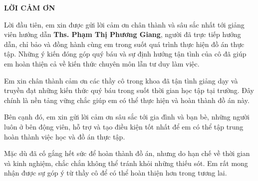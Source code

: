 \documentclass[../DoAn.tex]{subfiles}
\begin{document}
\begin{center}
    \Large{\textbf{LỜI CẢM ƠN}}\\
\end{center}

Lời đầu tiên, em xin được gửi lời cảm ơn chân thành và sâu sắc nhất tới giảng viên hướng dẫn \textbf{Ths. Phạm Thị Phương Giang}, người đã trực tiếp hướng dẫn, chỉ bảo và đồng hành cùng em trong suốt quá trình thực hiện đồ án thực tập. Những ý kiến đóng góp quý báu và sự định hướng tận tình của cô đã giúp em hoàn thiện cả về kiến thức chuyên môn lẫn tư duy làm việc.

Em xin chân thành cảm ơn các thầy cô trong khoa đã tận tình giảng dạy và truyền đạt những kiến thức quý báu trong suốt thời gian học tập tại trường. Đây chính là nền tảng vững chắc giúp em có thể thực hiện và hoàn thành đồ án này.

Bên cạnh đó, em xin gửi lời cảm ơn sâu sắc tới gia đình và bạn bè, những người luôn ở bên động viên, hỗ trợ và tạo điều kiện tốt nhất để em có thể tập trung hoàn thành việc học và đồ án thực tập. 

Mặc dù đã cố gắng hết sức để hoàn thành đồ án, nhưng do hạn chế về thời gian và kinh nghiệm, chắc chắn không thể tránh khỏi những thiếu sót. Em rất mong nhận được sự góp ý từ thầy cô để có thể hoàn thiện hơn trong tương lai.
\end{document}
